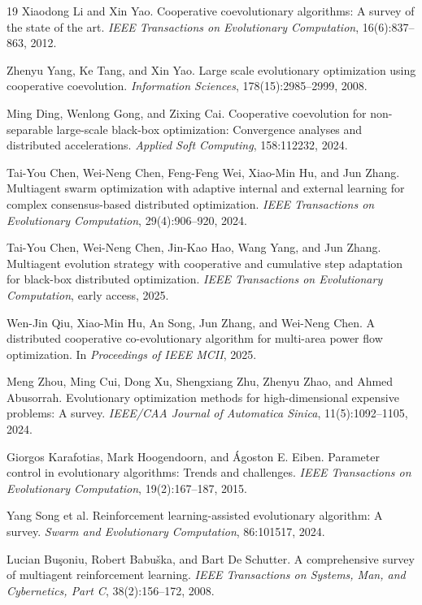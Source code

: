 \begin{thebibliography}{19}
Xiaodong Li and Xin Yao.
Cooperative coevolutionary algorithms: A survey of the state of the art.
\emph{IEEE Transactions on Evolutionary Computation}, 16(6):837--863, 2012.

Zhenyu Yang, Ke Tang, and Xin Yao.
Large scale evolutionary optimization using cooperative coevolution.
\emph{Information Sciences}, 178(15):2985--2999, 2008.

Ming Ding, Wenlong Gong, and Zixing Cai.
Cooperative coevolution for non-separable large-scale black-box optimization: Convergence analyses and distributed accelerations.
\emph{Applied Soft Computing}, 158:112232, 2024.

Tai-You Chen, Wei-Neng Chen, Feng-Feng Wei, Xiao-Min Hu, and Jun Zhang.
Multiagent swarm optimization with adaptive internal and external learning for complex consensus-based distributed optimization.
\emph{IEEE Transactions on Evolutionary Computation}, 29(4):906--920, 2024.

Tai-You Chen, Wei-Neng Chen, Jin-Kao Hao, Wang Yang, and Jun Zhang.
Multiagent evolution strategy with cooperative and cumulative step adaptation for black-box distributed optimization.
\emph{IEEE Transactions on Evolutionary Computation}, early access, 2025.

Wen-Jin Qiu, Xiao-Min Hu, An Song, Jun Zhang, and Wei-Neng Chen.
A distributed cooperative co-evolutionary algorithm for multi-area power flow optimization.
In \emph{Proceedings of IEEE MCII}, 2025.

Meng Zhou, Ming Cui, Dong Xu, Shengxiang Zhu, Zhenyu Zhao, and Ahmed Abusorrah.
Evolutionary optimization methods for high-dimensional expensive problems: A survey.
\emph{IEEE/CAA Journal of Automatica Sinica}, 11(5):1092--1105, 2024.

Giorgos Karafotias, Mark Hoogendoorn, and \'Agoston E. Eiben.
Parameter control in evolutionary algorithms: Trends and challenges.
\emph{IEEE Transactions on Evolutionary Computation}, 19(2):167--187, 2015.

Yang Song et al.
Reinforcement learning-assisted evolutionary algorithm: A survey.
\emph{Swarm and Evolutionary Computation}, 86:101517, 2024.

Lucian Bu\c{s}oniu, Robert Babu\v{s}ka, and Bart De Schutter.
A comprehensive survey of multiagent reinforcement learning.
\emph{IEEE Transactions on Systems, Man, and Cybernetics, Part C}, 38(2):156--172, 2008.

\end{thebibliography}

